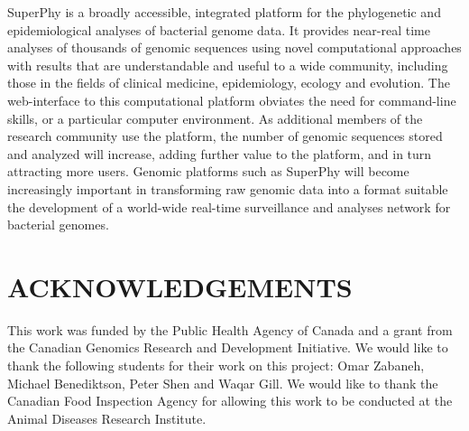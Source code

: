 \documentclass[a4paper,twoside]{article}
\begin{document}
\noindent SuperPhy is a broadly accessible, integrated platform for the phylogenetic and epidemiological analyses of bacterial genome data. It provides near-real time analyses of thousands of genomic sequences using novel computational approaches with results that are understandable and useful to a wide community, including those in the fields of clinical medicine, epidemiology, ecology and evolution. The web-interface to this computational platform obviates the need for command-line skills, or a particular computer environment. As additional members of the research community use the platform, the number of genomic sequences stored and analyzed will increase, adding further value to the platform, and in turn attracting more users. Genomic platforms such as SuperPhy will become increasingly important in transforming raw genomic data into a format suitable the development of a world-wide real-time surveillance and analyses network for bacterial genomes.

\section*{\uppercase{Acknowledgements}}

\noindent This work was funded by the Public Health Agency of Canada and a grant from the Canadian Genomics Research and Development Initiative. We would like to thank the following students for their work on this project: Omar Zabaneh, Michael Benediktson, Peter Shen and Waqar Gill. We would like to thank the Canadian Food Inspection Agency for allowing this work to be conducted at the Animal Diseases Research Institute.


\vfill

{\small
}

\vfill
\end{document}
